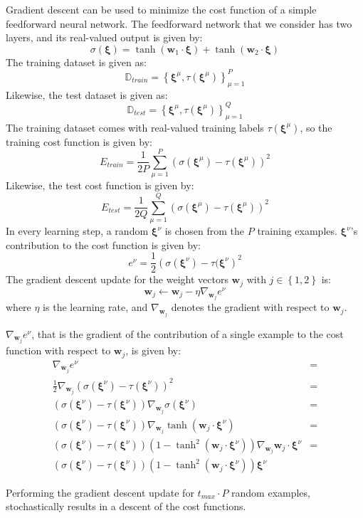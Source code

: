 Gradient descent can be used to minimize the cost function of a simple feedforward neural network.
The feedforward network that we consider has two layers, and its real-valued output is given by:
\[
	\sigma(\pmb{\xi}) = 
	\tanh(\mathbf{w}_1\cdot \pmb{\xi}) + \tanh(\mathbf{w}_2\cdot \pmb{\xi})
\]
The training dataset is given as:
\[
\mathbb{D}_{train} =
	\left\{
		\pmb{\xi}^\mu, \tau(\pmb{\xi}^\mu)
	\right\}_{\mu=1}^{P}
\]
Likewise, the test dataset is given as:
\[
\mathbb{D}_{test} =
	\left\{
		\pmb{\xi}^\mu, \tau(\pmb{\xi}^\mu)
	\right\}_{\mu=1}^{Q}
\]
The training dataset comes with real-valued training labels \(\tau(\pmb{\xi}^\mu)\), so the training cost function is given by:
\[
	E_{train} = 
	\frac{1}{2P}
	\sum_{\mu=1}^P(\sigma(\pmb{\xi}^\mu) - \tau(\pmb{\xi}^\mu))^2
\]
Likewise, the test cost function is given by:
\[
	E_{test} = 
	\frac{1}{2Q}
	\sum_{\mu=1}^Q(\sigma(\pmb{\xi}^\mu) - \tau(\pmb{\xi}^\mu))^2
\]
In every learning step, a random \(\pmb{\xi}^\nu\) is chosen from the \(P\) training examples.
\(\pmb{\xi}^\nu\)'s contribution to the cost function is given by:
\[
	e^\nu = 
	\frac{1}{2}\left(
		\sigma(\pmb{\xi}^\nu) - \tau(\pmb{\xi}^\nu
	\right)^2
\]
The gradient descent update for the weight vectors \(\mathbf{w}_j\) with \(j \in \left\{1, 2\right\}\) is:
\[
	\mathbf{w}_j \leftarrow \mathbf{w}_j - \eta \nabla_{\mathbf{w}_j}e^\nu
\]
where \(\eta\) is the learning rate, and \(\nabla_{\mathbf{w}_j}\) denotes the gradient with respect to \(\mathbf{w}_j\).

\(\nabla_{\mathbf{w}_j}e^\nu\), that is the gradient of the contribution of a single example to the cost function with respect to \(\mathbf{w}_j\), is given by:
\begin{align*}
	\nabla_{\mathbf{w}_j}e^\nu
	&= \\
	\frac{1}{2} \nabla_{\mathbf{w}_j} \left( 
		\sigma(\pmb{\xi}^\nu) - \tau(\pmb{\xi}^\nu)
	\right)^2
	&= \\
	(\sigma(\pmb{\xi}^\nu) - \tau(\pmb{\xi}^\nu))
	\nabla_{\mathbf{w}_j}
	\sigma(\pmb{\xi}^\nu)
	&= \\
	(\sigma(\pmb{\xi}^\nu) - \tau(\pmb{\xi}^\nu))
	\nabla_{\mathbf{w}_j}
	\tanh(\mathbf{w}_j\cdot\pmb{\xi}^\nu)
	&= \\
	(\sigma(\pmb{\xi}^\nu) - \tau(\pmb{\xi}^\nu))
	(1 - \tanh^2(\mathbf{w}_j\cdot\pmb{\xi}^\nu))
	\nabla_{\mathbf{w}_j}
	\mathbf{w}_j\cdot\pmb{\xi}^\nu
	&= \\
	(\sigma(\pmb{\xi}^\nu) - \tau(\pmb{\xi}^\nu))
	(1 - \tanh^2(\mathbf{w}_j\cdot\pmb{\xi}^\nu))
	\pmb{\xi}^\nu
\end{align*}

Performing the gradient descent update for \(t_{max} \cdot P\) random examples, stochastically results in a descent of the cost functions.

\[\]